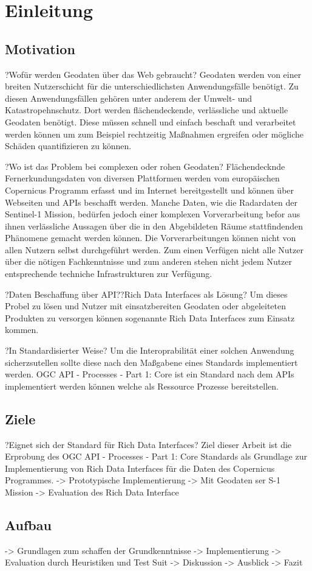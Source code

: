 \newpage
\restoregeometry
\section{Einleitung}
\subsection{Motivation}
?Wofür werden Geodaten über das Web gebraucht?
Geodaten werden von einer breiten Nutzerschicht für die unterschiedlichsten Anwendungsfälle benötigt.
Zu diesen Anwendungsfällen gehören unter anderem der Umwelt- und Katastropehnschutz. Dort werden flächendeckende,
verlässliche und aktuelle Geodaten benötigt. Diese müssen schnell und einfach beschaft und verarbeitet werden können
um zum Beispiel rechtzeitig Maßnahmen ergreifen oder mögliche Schäden quantifizieren zu können. 

?Wo ist das Problem bei complexen oder rohen Geodaten?
Flächendecknde Fernerkundungsdaten von diversen Plattformen werden vom europäischen Copernicus Programm 
erfasst und im Internet bereitgestellt und können über Webseiten und APIs beschafft werden. 
Manche Daten, wie die Radardaten der Sentinel-1 Mission, bedürfen jedoch einer komplexen Vorverarbeitung befor aus ihnen verlässliche Aussagen über die in den Abgebildeten Räume 
stattfindenden Phänomene gemacht werden können. Die Vorverarbeitungen können nicht von allen Nutzern selbst durchgeführt werden. Zum einen Verfügen nicht alle Nutzer über die 
nötigen Fachkenntnisse und zum anderen stehen nicht jedem Nutzer entsprechende techniche Infrastrukturen zur Verfügung. 

?Daten Beschaffung über API??Rich Data Interfaces als Lösung?
Um dieses Probel zu lösen und Nutzer mit einsatzbereiten Geodaten oder abgeleiteten Produkten zu versorgen können sogenannte Rich Data Interfaces zum Einsatz kommen.  

?In Standardisierter Weise?
Um die Interoprabilität einer solchen Anwendung sicherzsutellen sollte diese nach den Maßgabene eines Standards implementiert werden. OGC API - Processes - Part 1: Core ist ein 
Standard nach dem APIs implementiert werden können welche als Ressource Prozesse bereitstellen. 

\subsection{Ziele}
?Eignet sich der Standard für Rich Data Interfaces?
Ziel dieser Arbeit ist die Erprobung des OGC API - Processes - Part 1: Core Standards als Grundlage zur Implementierung von Rich Data Interfaces für die 
Daten des Copernicus Programmes. 
-> Prototypische Implementierung
-> Mit Geodaten ser S-1 Mission
-> Evaluation des Rich Data Interface
\subsection{Aufbau} 
-> Grundlagen zum schaffen der Grundkenntnisse
-> Implementierung
-> Evaluation durch Heuristiken und Test Suit 
-> Diskussion
-> Ausblick
-> Fazit


